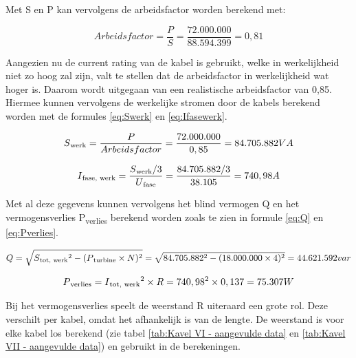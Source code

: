 Met S en P kan vervolgens de arbeidsfactor worden berekend met: 

\begin{equation} \label{eq:Arbeidfactor}
Arbeidsfactor = \frac{P}{S} = \frac{72.000.000}{88.594.399} = 0,81
\end{equation}

Aangezien nu de current rating van de kabel is gebruikt, welke in werkelijkheid niet zo hoog zal zijn, valt te stellen dat de arbeidsfactor in werkelijkheid wat hoger is. Daarom wordt uitgegaan van een realistische arbeidsfactor van 0,85. Hiermee kunnen vervolgens de werkelijke stromen door de kabels berekend worden met de formules \ref{eq:Swerk} en \ref{eq:Ifasewerk}. 

\begin{equation} \label{eq:Swerk}
S\textsubscript{werk} = \frac{P}{Arbeidsfactor} = \frac{72.000.000}{0,85} = 84.705.882VA
\end{equation}

\begin{equation} \label{eq:Ifasewerk}
I\textsubscript{fase, werk} = \frac{S\textsubscript{werk}/3}{U\textsubscript{fase}} = \frac{84.705.882/3}{38.105} = 740,98A
\end{equation}

Met al deze gegevens kunnen vervolgens het blind vermogen Q en het vermogensverlies P\textsubscript{verlies} berekend worden zoals te zien in formule \ref{eq:Q} en \ref{eq:Pverlies}.

\begin{equation} \label{eq:Q}
Q = \sqrt{S\textsubscript{tot, werk}^2 - (P\textsubscript{turbine} \times N)^2} = \sqrt{84.705.882^2 - (18.000.000 \times 4)^2} = 44.621.592var
\end{equation}

\begin{equation} \label{eq:Pverlies}
P\textsubscript{verlies} = I\textsubscript{tot, werk}^2 \times R = 740,98^2 \times 0,137 = 75.307W
\end{equation}

Bij het vermogensverlies speelt de weerstand R uiteraard een grote rol. Deze verschilt per kabel, omdat het afhankelijk is van de lengte. De weerstand is voor elke kabel los berekend (zie tabel \ref{tab:Kavel VI - aangevulde data} en \ref{tab:Kavel VII - aangevulde data}) en gebruikt in de berekeningen.


